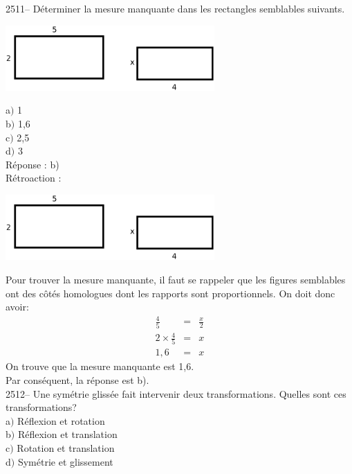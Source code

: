 \documentclass[letterpaper, 12pt]{article}
\begin{document}
2511--  D\'eterminer la mesure manquante dans les rectangles semblables suivants.
\begin{center}
 \includegraphics[width=8cm,bb=0 532 724 842]{Q2511.eps}
\end{center}
a$)$ 1\\
b$)$ 1,6\\
c$)$ 2,5\\
d$)$ 3\\

R\'eponse : b)\\

R\'etroaction :\\
\begin{center}
 \includegraphics[width=8cm,bb=0 532 724 842]{Q2511.eps}
\end{center}
Pour trouver la mesure manquante, il faut se rappeler que les figures semblables ont des c\^ot\'es homologues dont les rapports sont proportionnels. On doit donc avoir:
\begin{eqnarray*}
 \frac{4}{5}&=&\frac{x}{2}\\[2mm]
 2\times \frac{4}{5}&=&x\\[2mm]
 1,6 &=&x
\end{eqnarray*}
On trouve que la mesure manquante est 1,6.\\
Par cons\'equent, la r\'eponse est b).\\


2512-- Une sym\'etrie gliss\'ee fait intervenir deux transformations. Quelles sont ces transformations?\\

a$)$ R\'eflexion et rotation\\
b$)$ R\'eflexion et translation\\
c$)$ Rotation et translation\\
d$)$ Sym\'etrie et glissement\\
\end{document}
